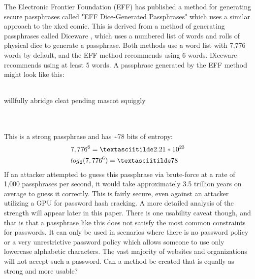 \documentclass[
	a4paper, %
	10pt, %
	unnumberedsections, %
	twoside, %
]{LTJournalArticle}
\begin{document}
The Electronic Frontier Foundation (EFF) has published a method for generating secure passphrases called "EFF Dice-Generated Passphrases" \autocite{effdice} which uses a similar approach to the xkcd comic. This is derived from a method of generating passphrases called Diceware \autocite{diceware}, which uses a numbered list of words and rolls of physical dice to generate a passphrase. Both methods use a word list with 7,776 words by default, and the EFF method recommends using 6 words. Diceware recommends using at least 5 words. A passphrase generated by the EFF method might look like this:
\\~\\
\centerline{willfully abridge cleat pending mascot squiggly}
\\~\\
This is a strong passphrase and has \textasciitilde78 bits of entropy:
\begin{align*}
& 7,776\textsuperscript{6} = \textasciitilde2.21 * 10\textsuperscript{23} \\
& log\textsubscript{2}(7,776\textsuperscript{6}) = \textasciitilde78
\end{align*}
If an attacker attempted to guess this passphrase via brute-force at a rate of 1,000 passphrases per second, it would take approximately 3.5 trillion years on average to guess it correctly. This is fairly secure, even against an attacker utilizing a GPU for password hash cracking. A more detailed analysis of the strength will appear later in this paper. There is one usability caveat though, and that is that a passphrase like this does not satisfy the most common constraints for passwords. It can only be used in scenarios where there is no password policy or a very unrestrictive password policy which allows someone to use only lowercase alphabetic characters. The vast majority of websites and organizations will not accept such a password. Can a method be created that is equally as strong and more usable?

\end{document}
